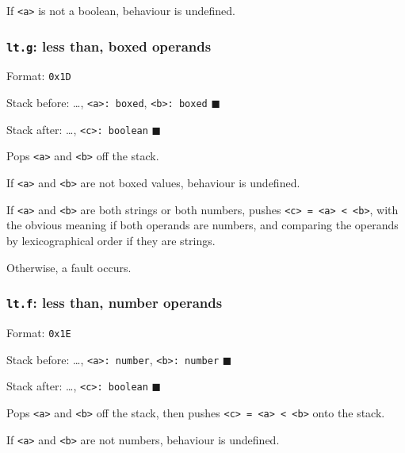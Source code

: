If \texttt{\textless{}a\textgreater{}} is not a boolean, behaviour is
undefined.

\subsubsection{\texorpdfstring{\texttt{lt.g}: less than, boxed
operands}{lt.g: less than, boxed operands}}

Format: \texttt{0x1D}

Stack before: \ldots, \texttt{\textless{}a\textgreater{}:\ boxed},
\texttt{\textless{}b\textgreater{}:\ boxed} \(\blacksquare\)

Stack after: \ldots, \texttt{\textless{}c\textgreater{}:\ boolean}
\(\blacksquare\)

Pops \texttt{\textless{}a\textgreater{}} and
\texttt{\textless{}b\textgreater{}} off the stack.

If \texttt{\textless{}a\textgreater{}} and
\texttt{\textless{}b\textgreater{}} are not boxed values, behaviour is
undefined.

If \texttt{\textless{}a\textgreater{}} and
\texttt{\textless{}b\textgreater{}} are both strings or both numbers,
pushes
\texttt{\textless{}c\textgreater{}\ =\ \textless{}a\textgreater{}\ \textless{}\ \textless{}b\textgreater{}},
with the obvious meaning if both operands are numbers, and comparing the
operands by lexicographical order if they are strings.

Otherwise, a fault occurs.

\subsubsection{\texorpdfstring{\texttt{lt.f}: less than, number
operands}{lt.f: less than, number operands}}

Format: \texttt{0x1E}

Stack before: \ldots, \texttt{\textless{}a\textgreater{}:\ number},
\texttt{\textless{}b\textgreater{}:\ number} \(\blacksquare\)

Stack after: \ldots, \texttt{\textless{}c\textgreater{}:\ boolean}
\(\blacksquare\)

Pops \texttt{\textless{}a\textgreater{}} and
\texttt{\textless{}b\textgreater{}} off the stack, then pushes
\texttt{\textless{}c\textgreater{}\ =\ \textless{}a\textgreater{}\ \textless{}\ \textless{}b\textgreater{}}
onto the stack.

If \texttt{\textless{}a\textgreater{}} and
\texttt{\textless{}b\textgreater{}} are not numbers, behaviour is
undefined.

